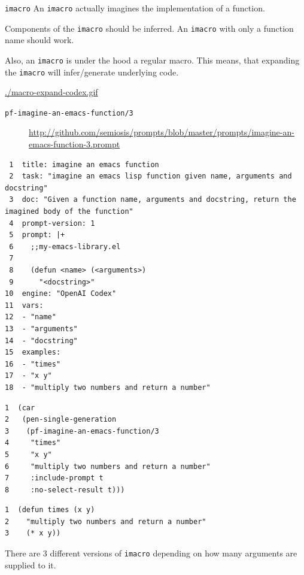 \documentclass[presentation]{beamer}
\begin{document}
\begin{frame}[label={sec:org6226c7b},fragile]{\texttt{imacro}}
 An \texttt{imacro} actually imagines the
implementation of a function.

Components of the \texttt{imacro} should be inferred.
An \texttt{imacro} with only a function name should
work.

Also, an \texttt{imacro} is under the hood a regular
macro. This means, that expanding the \texttt{imacro}
will infer/generate underlying code.

\url{./macro-expand-codex.gif}

\begin{description}
\item[{\texttt{pf-imagine-an-emacs-function/3}}] \url{http://github.com/semiosis/prompts/blob/master/prompts/imagine-an-emacs-function-3.prompt}
\end{description}

\begin{verbatim}
 1  title: imagine an emacs function
 2  task: "imagine an emacs lisp function given name, arguments and docstring"
 3  doc: "Given a function name, arguments and docstring, return the imagined body of the function"
 4  prompt-version: 1
 5  prompt: |+
 6    ;;my-emacs-library.el
 7  
 8    (defun <name> (<arguments>)
 9      "<docstring>"
10  engine: "OpenAI Codex"
11  vars:
12  - "name"
13  - "arguments"
14  - "docstring"
15  examples:
16  - "times"
17  - "x y"
18  - "multiply two numbers and return a number"
\end{verbatim}

\begin{verbatim}
1  (car
2   (pen-single-generation
3    (pf-imagine-an-emacs-function/3
4     "times"
5     "x y"
6     "multiply two numbers and return a number"
7     :include-prompt t
8     :no-select-result t)))
\end{verbatim}

\begin{verbatim}
1  (defun times (x y)
2    "multiply two numbers and return a number"
3    (* x y))
\end{verbatim}

There are 3 different versions of \texttt{imacro}
depending on how many arguments are supplied to
it.


\end{frame}
\end{document}
